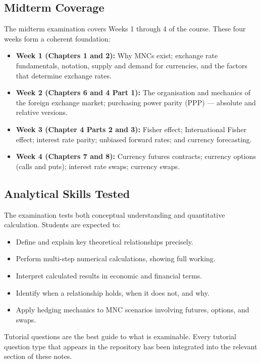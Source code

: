 \documentclass[11pt,a4paper]{article}
\begin{document}
\subsection{Midterm Coverage}

The midterm examination covers Weeks 1 through 4 of the course. These four weeks form a coherent foundation:

\begin{itemize}
  \item \textbf{Week 1 (Chapters 1 and 2):} Why MNCs exist; exchange rate fundamentals, notation, supply and demand for currencies, and the factors that determine exchange rates.
  \item \textbf{Week 2 (Chapters 6 and 4 Part 1):} The organisation and mechanics of the foreign exchange market; purchasing power parity (PPP) — absolute and relative versions.
  \item \textbf{Week 3 (Chapter 4 Parts 2 and 3):} Fisher effect; International Fisher effect; interest rate parity; unbiased forward rates; and currency forecasting.
  \item \textbf{Week 4 (Chapters 7 and 8):} Currency futures contracts; currency options (calls and puts); interest rate swaps; currency swaps.
\end{itemize}

\subsection{Analytical Skills Tested}

The examination tests both conceptual understanding and quantitative calculation. Students are expected to:

\begin{itemize}
  \item Define and explain key theoretical relationships precisely.
  \item Perform multi-step numerical calculations, showing full working.
  \item Interpret calculated results in economic and financial terms.
  \item Identify when a relationship holds, when it does not, and why.
  \item Apply hedging mechanics to MNC scenarios involving futures, options, and swaps.
\end{itemize}

Tutorial questions are the best guide to what is examinable. Every tutorial question type that appears in the repository has been integrated into the relevant section of these notes.
\end{document}
